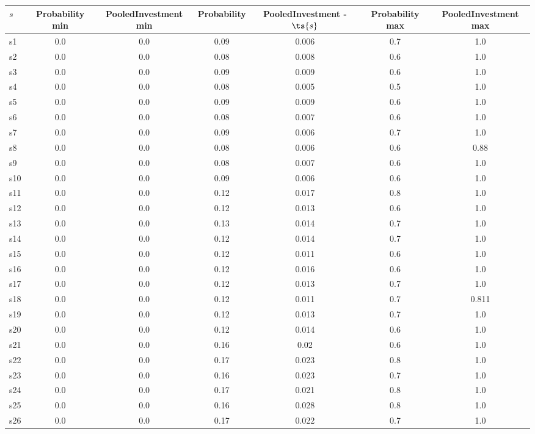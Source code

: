 \documentclass{article}
\begin{document}
\noindent\begin{tabular}{|l|c|c|c|c|c|c|}
\hline
$s$& Probability min & PooledInvestment min & Probability & PooledInvestment - $\ts{s}$ & Probability max & PooledInvestment max\\
\hline
s1 &0.0 & 0.0 & 0.09 & 0.006 & 0.7 & 1.0\\
\hline
s2 &0.0 & 0.0 & 0.08 & 0.008 & 0.6 & 1.0\\
\hline
s3 &0.0 & 0.0 & 0.09 & 0.009 & 0.6 & 1.0\\
\hline
s4 &0.0 & 0.0 & 0.08 & 0.005 & 0.5 & 1.0\\
\hline
s5 &0.0 & 0.0 & 0.09 & 0.009 & 0.6 & 1.0\\
\hline
s6 &0.0 & 0.0 & 0.08 & 0.007 & 0.6 & 1.0\\
\hline
s7 &0.0 & 0.0 & 0.09 & 0.006 & 0.7 & 1.0\\
\hline
s8 &0.0 & 0.0 & 0.08 & 0.006 & 0.6 & 0.88\\
\hline
s9 &0.0 & 0.0 & 0.08 & 0.007 & 0.6 & 1.0\\
\hline
s10 &0.0 & 0.0 & 0.09 & 0.006 & 0.6 & 1.0\\
\hline
s11 &0.0 & 0.0 & 0.12 & 0.017 & 0.8 & 1.0\\
\hline
s12 &0.0 & 0.0 & 0.12 & 0.013 & 0.6 & 1.0\\
\hline
s13 &0.0 & 0.0 & 0.13 & 0.014 & 0.7 & 1.0\\
\hline
s14 &0.0 & 0.0 & 0.12 & 0.014 & 0.7 & 1.0\\
\hline
s15 &0.0 & 0.0 & 0.12 & 0.011 & 0.6 & 1.0\\
\hline
s16 &0.0 & 0.0 & 0.12 & 0.016 & 0.6 & 1.0\\
\hline
s17 &0.0 & 0.0 & 0.12 & 0.013 & 0.7 & 1.0\\
\hline
s18 &0.0 & 0.0 & 0.12 & 0.011 & 0.7 & 0.811\\
\hline
s19 &0.0 & 0.0 & 0.12 & 0.013 & 0.7 & 1.0\\
\hline
s20 &0.0 & 0.0 & 0.12 & 0.014 & 0.6 & 1.0\\
\hline
s21 &0.0 & 0.0 & 0.16 & 0.02 & 0.6 & 1.0\\
\hline
s22 &0.0 & 0.0 & 0.17 & 0.023 & 0.8 & 1.0\\
\hline
s23 &0.0 & 0.0 & 0.16 & 0.023 & 0.7 & 1.0\\
\hline
s24 &0.0 & 0.0 & 0.17 & 0.021 & 0.8 & 1.0\\
\hline
s25 &0.0 & 0.0 & 0.16 & 0.028 & 0.8 & 1.0\\
\hline
s26 &0.0 & 0.0 & 0.17 & 0.022 & 0.7 & 1.0\\

\end{tabular}
\end{document}
